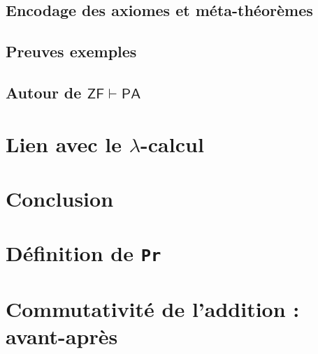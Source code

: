 \documentclass[a4paper]{article}
\newcommand{\PA}{\mathsf{PA}}
\newcommand{\ZF}{\mathsf{ZF}}
\theoremstyle{remark}
\theoremstyle{remark}
\theoremstyle{remark}
\theoremstyle{definition}
\theoremstyle{definition}
\theoremstyle{definition}
\begin{document}
\subsection{Encodage des axiomes et méta-théorèmes}

\subsection{Preuves exemples}

\subsection{Autour de $\ZF \vdash \PA$}


\section{Lien avec le $\lambda$-calcul}


\section{Conclusion}


\nocite{*}


\appendix
\newpage

\section{Définition de \texttt{Pr}}



\section{Commutativité de l'addition : avant-après}\label{beforeafter_comm_+}
\end{document}
